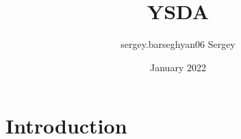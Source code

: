 \documentclass{article}
\title{YSDA}
\author{sergey.barseghyan06 Sergey}
\date{January 2022}
\begin{document}
\maketitle

\section{Introduction}
\end{document}
